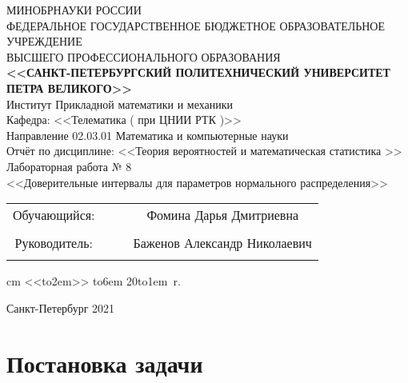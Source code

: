\documentclass[12pt]{article}
\begin{document}
\begin{center}
\hfill \break
\large{МИНОБРНАУКИ РОССИИ} \\
\hfill \break
\small {ФЕДЕРАЛЬНОЕ ГОСУДАРСТВЕННОЕ БЮДЖЕТНОЕ ОБРАЗОВАТЕЛЬНОЕ УЧРЕЖДЕНИЕ }\\
\small { ВЫСШЕГО ПРОФЕССИОНАЛЬНОГО ОБРАЗОВАНИЯ  } \\
\hfill \break
\normalsize {\textbf{ <<САНКТ-ПЕТЕРБУРГСКИЙ ПОЛИТЕХНИЧЕСКИЙ УНИВЕРСИТЕТ } }\\
{\normalsize {\textbf { ПЕТРА ВЕЛИКОГО>>}}} \\
\hfill \break
\large{Институт Прикладной математики и механики }\\
\hfill \break
\large{ Кафедра: <<Телематика ( при ЦНИИ РТК )>> }\\
\hfill \break
Направление 02.03.01 Математика и компьютерные науки\\
\vskip 1cm
\Large {Отчёт по дисциплине:}
\vskip 0.2cm
\Large{<<Теория вероятностей и математическая статистика >>} \\
\hfill \break
\large{Лабораторная работа № 8} \\
\hfill \break
\large{<<Доверительные интервалы для параметров нормального распределения>>} \\
\hfill \break
\vskip 0.3cm
\vskip 0.5cm
\end{center}


\begin {tabular}{cccc}
\hspace{0.5cm}Обучающийся: &\underline {\hspace{3cm}} &  &Фомина Дарья Дмитриевна \\\\
\hspace{0.5cm}Руководитель: &\underline {\hspace{3cm}} & &Баженов Александр Николаевич\\\\
\end{tabular}
 cm
\hspace{9cm}\def \hrf#1{\hbox to#1{\hrulefill}}<<\hrf{2em}>>  \hrf{6em}  20\hrf{1em}~r.
\vskip 1.5cm
\begin {center} Санкт-Петербург 2021 \end{center}

\thispagestyle{empty}

\newpage


\tableofcontents


\newpage
\section{Постановка задачи}
\end{document}
